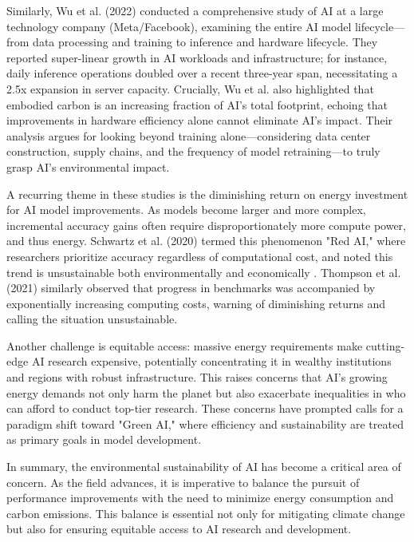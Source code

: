 \documentclass[a4paper,singleside,12pt]{report} %
\begin{document}
Similarly, Wu et al. (2022) conducted a comprehensive study of AI at a large technology company (Meta/Facebook), examining the 
entire AI model lifecycle—from data processing and training to inference and hardware lifecycle. They reported super-linear 
growth in AI workloads and infrastructure; for instance, daily inference operations doubled over a recent three-year span, 
necessitating a 2.5x expansion in server capacity. Crucially, Wu et al. also highlighted that embodied carbon is an increasing 
fraction of AI's total footprint, echoing that improvements in hardware efficiency alone cannot eliminate AI's impact. Their 
analysis argues for looking beyond training alone—considering data center construction, supply chains, and the frequency of 
model retraining—to truly grasp AI's environmental impact. \cite{wu2021sustainableai}

A recurring theme in these studies is the diminishing return on energy investment for AI model improvements. As models become 
larger and more complex, incremental accuracy gains often require disproportionately more compute power, and thus energy. 
Schwartz et al. (2020) termed this phenomenon "Red AI," where researchers prioritize accuracy regardless of computational cost, 
and noted this trend is unsustainable both environmentally and economically \cite{GreenAI}. Thompson et al. (2021) similarly 
observed that progress in benchmarks was accompanied by exponentially increasing computing costs, warning of diminishing returns 
and calling the situation unsustainable. \cite{thompson2021deeplearning}

Another challenge is equitable access: massive energy requirements make cutting-edge AI research expensive, potentially 
concentrating it in wealthy institutions and regions with robust infrastructure. This raises concerns that AI's growing energy 
demands not only harm the planet but also exacerbate inequalities in who can afford to conduct top-tier research. These concerns 
have prompted calls for a paradigm shift toward "Green AI," where efficiency and sustainability are treated as primary goals in 
model development.

In summary, the environmental sustainability of AI has become a critical area of concern. As the field advances, it is 
imperative to balance the pursuit of performance improvements with the need to minimize energy consumption and carbon emissions. 
This balance is essential not only for mitigating climate change but also for ensuring equitable access to AI research and 
development.
\end{document}
